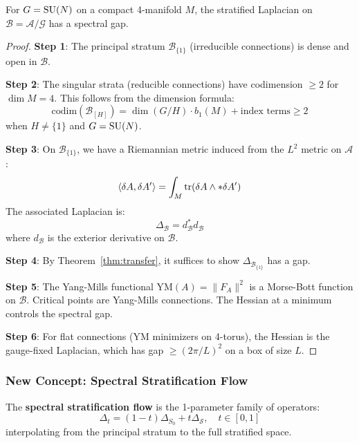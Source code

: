 \begin{theorem}\label{thm:gauge_orbit}
For $G = \mathrm{SU}(N)$ on a compact 4-manifold $M$, the stratified Laplacian on $\mathcal{B} = \mathcal{A}/\mathcal{G}$ has a spectral gap.
\end{theorem}

\begin{proof}
\textbf{Step 1}: The principal stratum $\mathcal{B}_{\{1\}}$ (irreducible connections) is dense and open in $\mathcal{B}$.

\textbf{Step 2}: The singular strata (reducible connections) have codimension $\geq 2$ for $\dim M = 4$. This follows from the dimension formula:
\[
\text{codim}(\mathcal{B}_{[H]}) = \dim(G/H) \cdot b_1(M) + \text{index terms} \geq 2
\]
when $H \neq \{1\}$ and $G = \mathrm{SU}(N)$.

\textbf{Step 3}: On $\mathcal{B}_{\{1\}}$, we have a Riemannian metric induced from the $L^2$ metric on $\mathcal{A}$:
\[
\langle \delta A, \delta A' \rangle = \int_M \operatorname{tr}(\delta A \wedge *\delta A')
\]
The associated Laplacian is:
\[
\Delta_{\mathcal{B}} = d_{\mathcal{B}}^* d_{\mathcal{B}}
\]
where $d_{\mathcal{B}}$ is the exterior derivative on $\mathcal{B}$.

\textbf{Step 4}: By Theorem~\ref{thm:transfer}, it suffices to show $\Delta_{\mathcal{B}_{\{1\}}}$ has a gap.

\textbf{Step 5}: The Yang-Mills functional $\text{YM}(A) = \|F_A\|^2$ is a Morse-Bott function on $\mathcal{B}$. Critical points are Yang-Mills connections. The Hessian at a minimum controls the spectral gap.

\textbf{Step 6}: For flat connections (YM minimizers on 4-torus), the Hessian is the gauge-fixed Laplacian, which has gap $\geq (2\pi/L)^2$ on a box of size $L$.
\end{proof}

\subsubsection{New Concept: Spectral Stratification Flow}

\begin{definition}
The \textbf{spectral stratification flow} is the 1-parameter family of operators:
\[
\Delta_t = (1-t)\Delta_{S_0} + t \Delta_{\mathcal{S}}, \quad t \in [0,1]
\]
interpolating from the principal stratum to the full stratified space.
\end{definition}

